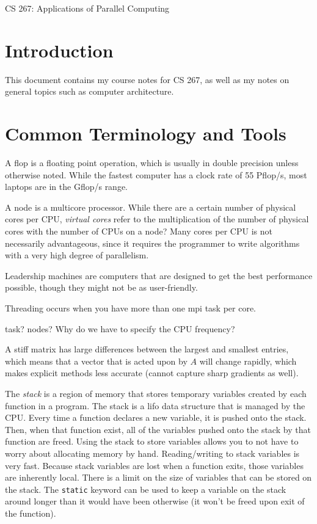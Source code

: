 \documentclass[10pt]{article}
\begin{document}
\begin{centering}
\Large CS 267: Applications of Parallel Computing\\
\end{centering}

\tableofcontents
\clearpage

\section{Introduction}
\begin{flushleft}\justify

This document contains my course notes for CS 267, as well as my notes on general topics such as computer architecture.

\section{Common Terminology and Tools}

A flop is a floating point operation, which is usually in double precision unless otherwise noted. While the fastest computer has a clock rate of 55 Pflop/s, most laptops are in the Gflop/s range. 

A node is a multicore processor. While there are a certain number of physical cores per CPU, \textit{virtual cores} refer to the multiplication of the number of physical cores with the number of CPUs on a node? Many cores per CPU is not necessarily advantageous, since it requires the programmer to write algorithms with a very high degree of parallelism.

Leadership machines are computers that are designed to get the best performance possible, though they might not be as user-friendly.

Threading occurs when you have more than one \gls{mpi} task per core. 

task? 
nodes?
Why do we have to specify the CPU frequency?

A stiff matrix has large differences between the largest and smallest entries, which means that a vector that is acted upon by \(A\) will change rapidly, which makes explicit methods less accurate (cannot capture sharp gradients as well). 

The \textit{stack} is a region of memory that stores temporary variables created by each function in a program. The stack is a \gls{lifo} data structure that is managed by the CPU. Every time a function declares a new variable, it is pushed onto the stack. Then, when that function exist, all of the variables pushed onto the stack by that function are freed. Using the stack to store variables allows you to not have to worry about allocating memory by hand. Reading/writing to stack variables is very fast. Because stack variables are lost when a function exits, those variables are inherently local. There is a limit on the size of variables that can be stored on the stack. The {\tt static} keyword can be used to keep a variable on the stack around longer than it would have been otherwise (it won't be freed upon exit of the function). 


\end{flushleft}
\end{document}
